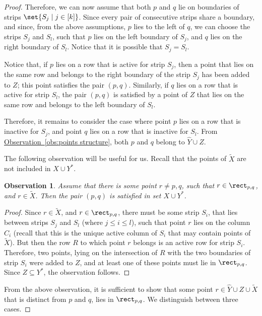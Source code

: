 \documentclass[11pt]{article}
\numberwithin{equation}{section}
\theoremstyle{definition}
\theoremstyle{plain}
\newcommand{\expref}[2]{\hyperref[#2]{#1~\ref{#2}}}
\newtheorem{myobs}[theorem]{Observation}
\begin{document}
\begin{proof}
Therefore, we can now assume that both $p$ and $q$ lie on boundaries of strips $\set{S_j \mid j \in [k]}$. Since every pair of consecutive strips share a boundary, and since, from the above assumptions, $p$ lies to the left of $q$, we can choose the strips $S_j$ and $S_{l}$, such that $p$ lies on the left boundary of $S_j$, and $q$ lies on the right boundary of $S_{l}$. Notice that it is possible that $S_j=S_{l}$.

Notice that, if $p$ lies on a row that is active for strip $S_j$, then a point that lies on the same row and belongs to the right boundary of the strip $S_j$ has been added to $Z$; this point satisfies the pair $(p,q)$. Similarly, if $q$ lies on a row that is active for strip $S_{l}$, the pair $(p,q)$ is satisfied by a point of $Z$ that lies on the same row and belongs to the left boundary of $S_{l}$.

Therefore, it remains to consider the case where point $p$ lies on a row that is inactive for $S_j$, and point $q$ lies on a row that is inactive for $S_{l}$. From \expref{Observation}{obs:points structure}, both $p$ and $q$ belong to $\hat Y\cup Z$.

The following observation will be useful for us. Recall that the points of $\widetilde{X}$ are not included in $X\cup Y^*$.

\begin{myobs}\label{obs: satisfied by Xc}
	Assume that there is some point $r\neq p,q$, such that $r\in \rect_{p,q}$, and $r\in \widetilde{X}$. Then the pair $(p,q)$ is satisfied in set $X\cup Y^*$.
	\end{myobs}
\begin{proof}
	Since $r\in \widetilde{X}$, and $r\in \rect_{p,q}$, there must be some strip $S_i$, that lies between strips $S_j$ and $S_{l}$ (where $j \leq i \leq l$), such that point $r$ lies on the column $C_i$ (recall that this is the unique active column of $S_i$ that may contain points of $\widetilde{X}$). But then the row $R$ to which point $r$ belongs is an active row for strip $S_i$. Therefore, two  points, lying on the intersection of $R$ with the two boundaries of strip $S_i$ were added to $Z$, and at least one of these points must lie in $\rect_{p,q}$. Since $Z\subseteq Y^*$, the observation follows.
\end{proof}



From the above observation, it is sufficient to show that some point $r\in \hat Y\cup Z\cup \widetilde{X}$ that is distinct from $p$ and $q$, lies in $\rect_{p,q}$.
We distinguish between three cases.


\end{proof}
\end{document}
